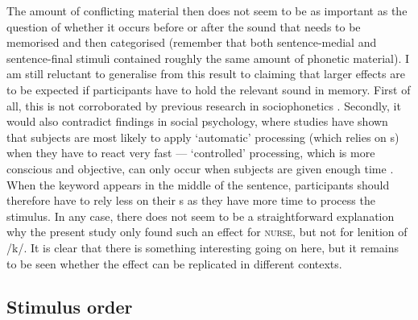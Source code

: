 The amount of conflicting material then does not seem to be as important as the question of whether it occurs before or after the sound that needs to be memorised and then categorised (remember that both sentence-medial and sentence-final stimuli contained roughly the same amount of phonetic material).
I am still reluctant to generalise from this result to claiming that larger  effects are to be expected if participants have to hold the relevant sound in memory.
First of all, this is not corroborated by previous research in sociophonetics \parencite{hayetal2006a,haydrager2010}.
Secondly, it would also contradict findings in social psychology, where studies have shown that subjects are most likely to apply `automatic' processing (which relies on s) when they have to react very fast --- `controlled' processing, which is more conscious and objective, can only occur when subjects are given enough time \parencite[cf.][33--34]{petersensix2008}.
When the keyword appears in the middle of the sentence, participants should therefore have to rely less on their s as they have more time to process the stimulus.
In any case, there does not seem to be a straightforward explanation why the present study only found such an effect for \textsc{nurse}, but not for lenition of /k/.
It is clear that there is something interesting going on here, but it remains to be seen whether the effect can be replicated in different contexts.

		\subsection{Stimulus order}

